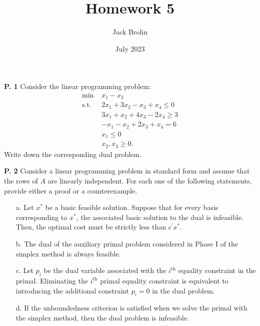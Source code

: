 \documentclass{article}
\title{Homework 5}
\author{Jack Brolin}
\date{July 2023}
\begin{document}
\maketitle

\begin{jacklist}
    \begin{framed} 
    \item [\textbf{P. 1}] Consider the linear programming problem: 
        \begin{align*}
            \text{min }  & x_{1}-x_{2} \\
            \text{s.t. } & 2 x_{1}+3 x_{2}-x_{3}+x_{4} \leq 0 \\
                         & 3 x_{1}+x_{2}+4 x_{3}-2 x_{4} \geq 3 \\
                         & -x_{1}-x_{2}+2 x_{3}+x_{4}=6 \\
                         & x_{1} \leq 0 \\
                         & x_{2}, x_{3} \geq 0 .
        \end{align*} 
        Write down the corresponding dual problem.
    \end{framed}
\newpage
    \begin{framed} 
    \item [\textbf{P. 2}] Consider a linear programming problem in standard form and assume that the rows of $A$ are 
        linearly independent. For each one of the following statements, provide either a proof or a counterexample.
        \begin{itemize}
            \item [a.] Let $x^{*}$ be a basic feasible solution. Suppose that for every basis corresponding to $x^{*}$, 
                the associated basic solution to the dual is infeasible. Then, the optimal cost must be 
                strictly less than $c^{\prime} x^{*}$.
            \item [b.] The dual of the auxiliary primal problem considered in Phase I of the simplex method is always feasible.
            \item [c.] Let $p_{i}$ be the dual variable associated with the $i^{\text{th}}$ equality constraint in the primal. 
                Eliminating the $i^{\text{th}}$ primal equality constraint is equivalent to introducing the additional constraint 
                $p_{i}=0$ in the dual problem.
            \item [d.]  If the unboundedness criterion is satisfied when we solve the primal with the simplex method, 
                then the dual problem is infeasible. 

\end{itemize}
\end{framed}
\end{jacklist}
\end{document}
